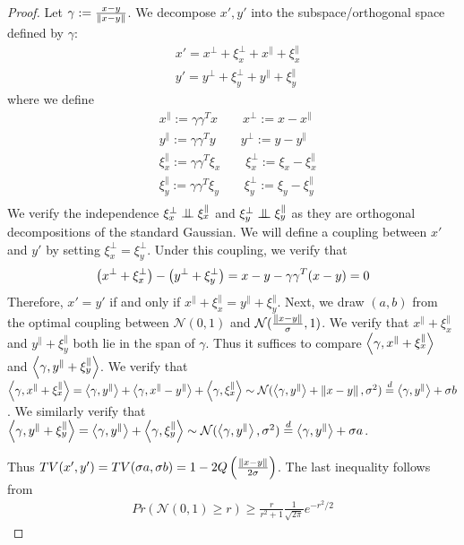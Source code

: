 \begin{proof}
Let $\gamma := \frac{x-y}{\left\| x-y \right\|}$. We  decompose $x', y'$ into the subspace/orthogonal space defined by $\gamma$:
\begin{align*}
    & x' = x^\perp + \xi_x^\perp + x^{\parallel} + \xi_x^\parallel\\
    & y' = y^\perp + \xi_y^\perp + y^{\parallel} + \xi_y^\parallel
\end{align*}
where we define
\begin{align*}
    & x^\parallel := \gamma \gamma^T x \qquad x^\perp := x - x^\parallel\\
    & y^\parallel := \gamma \gamma^T y \qquad y^\perp := y - y^\parallel\\
    & \xi_x^\parallel := \gamma \gamma^T \xi_x \qquad \xi_x^\perp := \xi_x - \xi_x^\parallel\\
    & \xi_y^\parallel := \gamma \gamma^T \xi_y \qquad \xi_y^\perp := \xi_y - \xi_y^\parallel\\
\end{align*}
We verify the independence $\xi_x^{\perp} \indep \xi_x^{\parallel}$ and $\xi_y^{\perp}\indep\xi_y^{\parallel}$ as they are orthogonal decompositions of the standard Gaussian. 
We will define a coupling between $x'$ and $y'$ by setting $\xi_x^{\perp} = \xi_y^{\perp}$. Under this coupling, we verify that
\begin{align*}
     \left( x^\perp + \xi_x^\perp \right) - \left( y^\perp + \xi_y^\perp \right)
    = x - y - \gamma \gamma^T (x - y) = 0
\end{align*}
Therefore, $x'=y'$ if and only if $x^{\parallel} + \xi_x^{\parallel} = y^{\parallel} + \xi_y^{\parallel}$. Next, we draw $(a,b)$ from the optimal coupling between $\mathcal{N}(0, 1)$ and $\mathcal{N}(\frac{\left\| x-y \right\|}{\sigma}, 1)$. We verify that $x^{\parallel} + \xi_x^{\parallel}$ and $y^{\parallel} + \xi_y^{\parallel}$ both lie in the span of $\gamma$. Thus it suffices to compare $\left\langle \gamma, x^{\parallel} + \xi_x^{\parallel} \right\rangle$ and $\left\langle \gamma, y^{\parallel} + \xi_y^{\parallel} \right\rangle$. We verify that $\left\langle \gamma, x^{\parallel} + \xi_x^{\parallel} \right\rangle = \left\langle \gamma, y^{\parallel} \right\rangle + \left\langle \gamma, x^{\parallel} - y^{\parallel} \right\rangle + \left\langle \gamma, \xi_x^{\parallel} \right\rangle\sim \mathcal{N}(\left\langle \gamma, y^{\parallel} \right\rangle + \left\| x-y \right\|,\sigma^2) \overset{d}{=} \left\langle \gamma, y^{\parallel} \right\rangle + \sigma b$. We similarly verify that $\left\langle \gamma, y^{\parallel} + \xi_y^{\parallel} \right\rangle = \left\langle \gamma, y^{\parallel} \right\rangle + \left\langle \gamma, \xi^{\parallel}_y \right\rangle \sim \mathcal{N}(\left\langle \gamma, y^{\parallel} \right\rangle, \sigma^2) \overset{d}{=} \left\langle \gamma, y^{\parallel} \right\rangle + \sigma a$. 

Thus $TV(x',y') = TV(\sigma a, \sigma b) = 1 - 2Q\left( \frac{\left\| x-y \right\|}{2\sigma} \right)$. The last inequality follows from
\begin{align*}
    Pr(\mathcal{N}(0,1) \geq r) \geq \frac{r}{r^2 + 1} \frac{1}{\sqrt{2\pi}} e^{- r^2 / 2}
\end{align*}
\end{proof}




